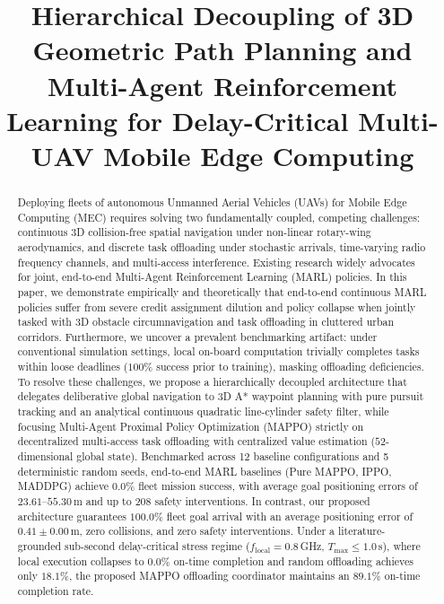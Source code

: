 \documentclass[conference]{IEEEtran}
\begin{document}
\title{Hierarchical Decoupling of 3D Geometric Path Planning and Multi-Agent Reinforcement Learning for Delay-Critical Multi-UAV Mobile Edge Computing}

\author{
}

\maketitle

\begin{abstract}
Deploying fleets of autonomous Unmanned Aerial Vehicles (UAVs) for Mobile Edge Computing (MEC) requires solving two fundamentally coupled, competing challenges: continuous 3D collision-free spatial navigation under non-linear rotary-wing aerodynamics, and discrete task offloading under stochastic arrivals, time-varying radio frequency channels, and multi-access interference. Existing research widely advocates for joint, end-to-end Multi-Agent Reinforcement Learning (MARL) policies. In this paper, we demonstrate empirically and theoretically that end-to-end continuous MARL policies suffer from severe credit assignment dilution and policy collapse when jointly tasked with 3D obstacle circumnavigation and task offloading in cluttered urban corridors. Furthermore, we uncover a prevalent benchmarking artifact: under conventional simulation settings, local on-board computation trivially completes tasks within loose deadlines ($100\%$ success prior to training), masking offloading deficiencies. To resolve these challenges, we propose a hierarchically decoupled architecture that delegates deliberative global navigation to 3D A* waypoint planning with pure pursuit tracking and an analytical continuous quadratic line-cylinder safety filter, while focusing Multi-Agent Proximal Policy Optimization (MAPPO) strictly on decentralized multi-access task offloading with centralized value estimation ($52$-dimensional global state). Benchmarked across 12 baseline configurations and 5 deterministic random seeds, end-to-end MARL baselines (Pure MAPPO, IPPO, MADDPG) achieve $0.0\%$ fleet mission success, with average goal positioning errors of $23.61$--$55.30$\,m and up to 208 safety interventions. In contrast, our proposed architecture guarantees $100.0\%$ fleet goal arrival with an average positioning error of $0.41 \pm 0.00$\,m, zero collisions, and zero safety interventions. Under a literature-grounded sub-second delay-critical stress regime ($f_{\text{local}} = 0.8$\,GHz, $T_{\text{max}} \le 1.0$\,s), where local execution collapses to $0.0\%$ on-time completion and random offloading achieves only $18.1\%$, the proposed MAPPO offloading coordinator maintains an $89.1\%$ on-time completion rate.
\end{abstract}
\end{document}
